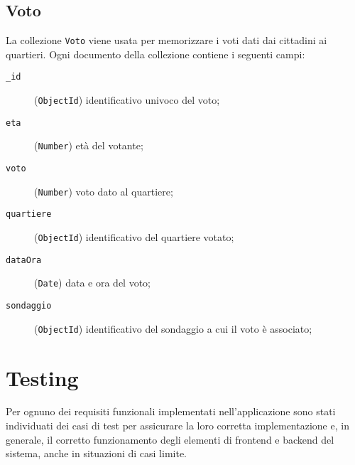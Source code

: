     \subsection{Voto}
        La collezione \texttt{Voto} viene usata per memorizzare i voti dati dai cittadini ai quartieri. Ogni documento della collezione contiene i seguenti campi:
        \begin{description}
            \item[\texttt{\_id}] (\texttt{ObjectId}) identificativo univoco del voto;
            \item[\texttt{eta}] (\texttt{Number}) età del votante;
            \item[\texttt{voto}] (\texttt{Number}) voto dato al quartiere;
            \item[\texttt{quartiere}] (\texttt{ObjectId}) identificativo del quartiere votato;
            \item[\texttt{dataOra}] (\texttt{Date}) data e ora del voto;
            \item[\texttt{sondaggio}] (\texttt{ObjectId}) identificativo del sondaggio a cui il voto è associato;
        \end{description}
\section{Testing}

    Per ognuno dei requisiti funzionali implementati nell'applicazione sono stati individuati dei casi di test per assicurare la loro corretta implementazione e, in generale, il corretto funzionamento degli elementi di frontend e backend del sistema, anche in situazioni di casi limite.

